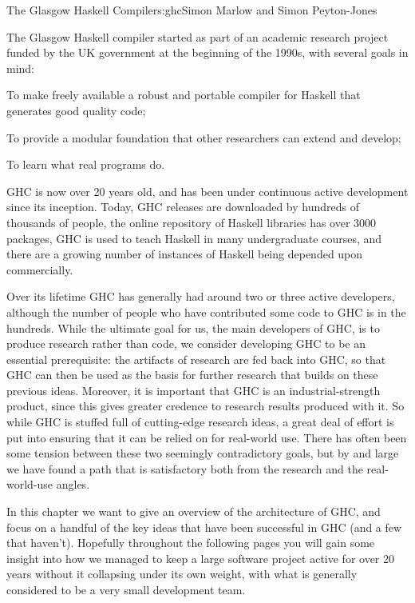 \begin{aosachapter}{The Glasgow Haskell Compiler}{s:ghc}{Simon Marlow and Simon Peyton-Jones}

The Glasgow Haskell compiler started as part of an academic research
project funded by the UK government at the beginning of the 1990s,
with several goals in mind:

\begin{aosaitemize}

\item To make freely available a robust and portable compiler for
  Haskell that generates good quality code;

\item To provide a modular foundation that other researchers can
  extend and develop;

\item To learn what real programs do.

\end{aosaitemize}

GHC is now over 20 years old, and has been under continuous active
development since its inception.  Today, GHC releases are downloaded
by hundreds of thousands of people, the online repository of Haskell
libraries has over 3000 packages, GHC is used to teach Haskell in many
undergraduate courses, and there are a growing number of instances of
Haskell being depended upon commercially.

Over its lifetime GHC has generally had around two or three active
developers, although the number of people who have contributed some
code to GHC is in the hundreds.  While the ultimate goal for us, the
main developers of GHC, is to produce research rather than code, we
consider developing GHC to be an essential prerequisite: the artifacts
of research are fed back into GHC, so that GHC can then be used as the
basis for further research that builds on these previous ideas.
Moreover, it is important that GHC is an industrial-strength product,
since this gives greater credence to research results produced with
it.  So while GHC is stuffed full of cutting-edge research ideas, a
great deal of effort is put into ensuring that it can be relied on for
real-world use.  There has often been some tension between these two
seemingly contradictory goals, but by and large we have found a path
that is satisfactory both from the research and the real-world-use
angles.

In this chapter we want to give an overview of the architecture of
GHC, and focus on a handful of the key ideas that have been successful
in GHC (and a few that haven't).  Hopefully throughout the following
pages you will gain some insight into how we managed to keep a large
software project active for over 20 years without it collapsing under
its own weight, with what is generally considered to be a very small
development team.


\end{aosachapter}
